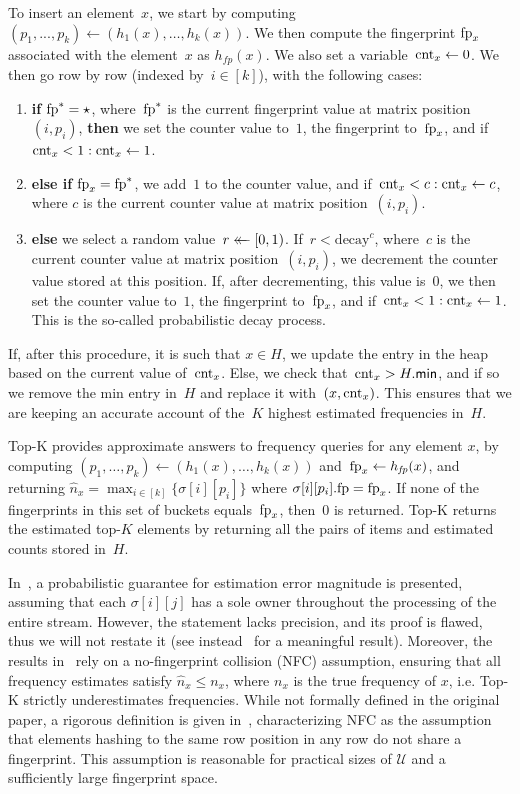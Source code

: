 To insert an element~$x$, we start by computing $(p_1,...,p_k) \gets (h_1(x),\ldots,h_k(x))$. We then compute the fingerprint $\textup{fp}_x$ associated with the element~$x$ as $h_\mathit{fp}(x)$. We also set a variable~$\textup{cnt}_x \gets 0$. We then go row by row (indexed by~$i \in [k]$), with the following cases:
\begin{enumerate}
    \item \textbf{if} $\textup{fp}^{*} = \star$, 
	where~$\textup{fp}^{*}$ is the current fingerprint value at matrix position~$(i,p_i)$, \textbf{then} we set the counter value to~$1$, the fingerprint to~$\textup{fp}_x$, and if~$\textup{cnt}_x < 1 : \textup{cnt}_x \gets 1$.
    \item \textbf{else if} $\textup{fp}_x = \textup{fp}^{*}$,
    we add~$1$ to the counter value, and if~$\textup{cnt}_x < c : \textup{cnt}_x \gets c$, where $c$ is the current counter value at matrix position~$(i,p_i)$. 
    \item \textbf{else}
    we select a random value~$r \mathrel{\leftarrow\mkern-14mu\leftarrow} [0,1)$. If~$r < \mathrm{decay}^{c}$, where~$c$ is the current counter value at matrix position~$(i,p_i)$, we decrement the counter value stored at this position. If, after decrementing, this value is~$0$, we then set the counter value to~$1$, the fingerprint to~$\textup{fp}_x$, and if~$\textup{cnt}_x < 1 : \textup{cnt}_x \gets 1$. This is the so-called probabilistic decay process. 
\end{enumerate}

If, after this procedure, it is such that $x \in H$, we update the entry in the heap based on the current value of~$\textup{cnt}_x$. Else, we check that~$\textup{cnt}_x > H.\mathsf{min}$, and if so we remove the min entry in~$H$ and replace it with~$(x,\textup{cnt}_x)$. This ensures that we are keeping an accurate account of the~$K$ highest estimated frequencies in~$H$. 

Top-K provides approximate answers to frequency queries for any element $x$, by 
computing $(p_1,\ldots,p_k) \gets (h_1(x),\ldots,h_k(x))$ and~$\textup{fp}_x \gets h_\mathit{fp}(x)$, and returning $\hat{n}_x = \max_{i \in [k]} \{\sigma[i][p_i]\}$ where $\sigma[i][p_i].\textup{fp} = \textup{fp}_x$. %
If none of the fingerprints in this set of buckets equals~$\textup{fp}_x$, then~$0$ is returned. 
Top-K returns the estimated top-$K$ elements by returning all the pairs of items and estimated counts stored in~$H$. 


In~\cite{yang2019heavykeeper}, a probabilistic guarantee for estimation error magnitude is presented, assuming that each $\sigma[i][j]$ has a sole owner throughout the processing of the entire stream. However, the statement lacks precision, and its proof is flawed, thus we will not restate it (see instead~\cite{markelon23} for a meaningful result). Moreover, the results in~\cite{yang2019heavykeeper} rely on a no-fingerprint collision (NFC) assumption, ensuring that all frequency estimates satisfy $\hat{n}_x \leq n_{x}$, where $n_x$ is the true frequency of $x$, i.e. Top-K strictly underestimates frequencies. While not formally defined in the original paper, a rigorous definition is given in~\cite{markelon23}, characterizing NFC as the assumption that elements hashing to the same row position in any row do not share a fingerprint. This assumption is reasonable for practical sizes of $\mathcal{U}$ and a sufficiently large fingerprint space.


